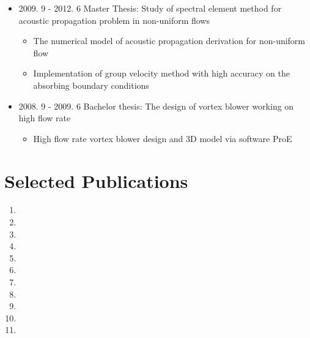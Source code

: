\documentclass[letterpaper]{article}
\begin{document}
\begin{itemize}
\item 2009. 9 - 2012. 6  \hspace{2pt} Master Thesis: Study of spectral element method for acoustic propagation problem in non-uniform flows
		\begin{itemize}
		\item	The numerical model of acoustic propagation derivation for non-uniform flow
		\item	Implementation of group velocity method with high accuracy on the absorbing boundary conditions
		\end{itemize}

\item 2008. 9 - 2009. 6  \hspace{2pt} Bachelor thesis: The design of vortex blower working on high flow rate
		\begin{itemize}
		\item High flow rate vortex blower design and 3D model via software ProE
		\end{itemize}
		
\end{itemize}

\vspace{-12pt}
\section*{Selected Publications}
\vspace{-10pt}




\begin{enumerate}
\item {}
\item {}
\item {}
\item {}
\item {}
\item {}
\item {}
\item {}
\item {}
\item {}
\item {}

\end{enumerate}
\end{document}
